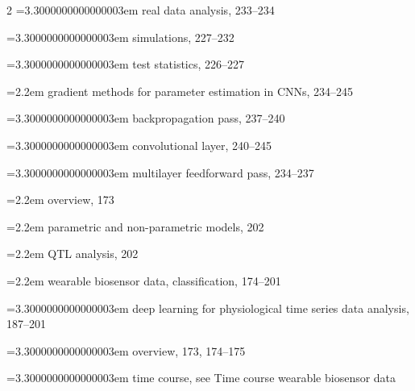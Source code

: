 \begin{multicols}{2}
\noindent\hangindent=3.3000000000000003em \hspace*{2.2em}real data analysis, 233--234\par
\noindent\hangindent=3.3000000000000003em \hspace*{2.2em}simulations, 227--232\par
\noindent\hangindent=3.3000000000000003em \hspace*{2.2em}test statistics, 226--227\par
\noindent\hangindent=2.2em \hspace*{1.1em}gradient methods for parameter estimation in CNNs, 234--245\par
\noindent\hangindent=3.3000000000000003em \hspace*{2.2em}backpropagation pass, 237--240\par
\noindent\hangindent=3.3000000000000003em \hspace*{2.2em}convolutional layer, 240--245\par
\noindent\hangindent=3.3000000000000003em \hspace*{2.2em}multilayer feedforward pass, 234--237\par
\noindent\hangindent=2.2em \hspace*{1.1em}overview, 173\par
\noindent\hangindent=2.2em \hspace*{1.1em}parametric and non-parametric models, 202\par
\noindent\hangindent=2.2em \hspace*{1.1em}QTL analysis, 202\par
\noindent\hangindent=2.2em \hspace*{1.1em}wearable biosensor data, classification, 174--201\par
\noindent\hangindent=3.3000000000000003em \hspace*{2.2em}deep learning for physiological time series data analysis, 187--201\par
\noindent\hangindent=3.3000000000000003em \hspace*{2.2em}overview, 173, 174--175\par
\noindent\hangindent=3.3000000000000003em \hspace*{2.2em}time course, see Time course wearable biosensor data\par


\end{multicols}
